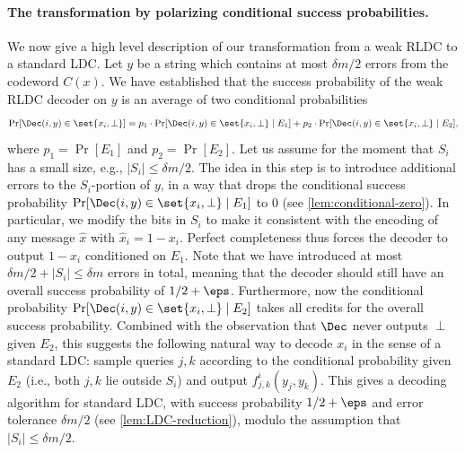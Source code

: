 \paragraph{The transformation by polarizing conditional success probabilities.} We now give a high level description of our transformation from a weak RLDC to a standard LDC. Let $y$ be a string which contains at most $\delta m/2$ errors from the codeword $C(x)$. We have established that the success probability of the weak RLDC decoder on $y$ is an average of two conditional probabilities
\begin{align*}
	\Pr[\Dec(i,y) \in \set{x_i, \perp}] = p_1 \cdot \Pr[\Dec(i,y) \in \set{x_i, \perp} \mid E_1] + p_2 \cdot \Pr[\Dec(i,y) \in \set{x_i, \perp} \mid E_2],
\end{align*}
where $p_1 = \Pr[E_1]$ and $p_2 = \Pr[E_2]$. Let us assume for the moment that $S_i$ has a small size, e.g., $|S_i|\le \delta m/2$. The idea in this step is to introduce additional errors to the $S_i$-portion of $y$, in a way that drops the conditional success probability $\Pr[\Dec(i,y) \in \set{x_i, \perp} \mid E_1]$ to 0 (see \cref{lem:conditional-zero}). In particular, we modify the bits in $S_i$ to make it consistent with the encoding of any message $\hat{x}$ with $\hat{x}_i=1-x_i$. Perfect completeness thus forces the decoder to output $1-x_i$ conditioned on $E_1$. Note that we have introduced at most $\delta m/2 + |S_i| \le \delta m$ errors in total, meaning that the decoder should still have an overall success probability of $1/2+\eps$. Furthermore, now the conditional probability $\Pr[\Dec(i,y) \in \set{x_i, \perp} \mid E_2]$ takes all credits for the overall success probability. Combined with the observation that $\Dec$ never outputs $\perp$ given $E_2$, this suggests the following natural way to decode $x_i$ in the sense of a standard LDC: sample queries $j, k$ according to the conditional probability given $E_2$ (i.e., both $j,k$ lie outside $S_i$) and output $f_{j,k}^{i}(y_j, y_k)$. This gives a decoding algorithm for standard LDC, with success probability $1/2+\eps$ and error tolerance $\delta m/2$ (see \cref{lem:LDC-reduction}), modulo the assumption that $|S_i|\le \delta m/2$.

